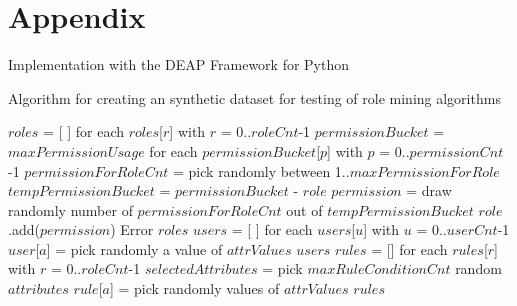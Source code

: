 \newpage
\section{Appendix}

Implementation with the DEAP Framework for Python \cite{DeRainville:2012}

\begin{algorithm}
\caption{Algorithm for creating an synthetic dataset for testing of role mining algorithms}
\label{alg:CreateDataSet}
\begin{algorithmic}[1]
    \State $roles$ = [ ] for each $roles$[$r$] with $r$ = 0..$roleCnt$-1
    \State $permissionBucket$ = $maxPermissionUsage$ for each $permissionBucket$[$p$] with $p$ = 0..$permissionCnt$-1
        \State $permissionForRoleCnt$ = pick randomly between 1..$maxPermissionForRole$
        \State $tempPermissionBucket$ = $permissionBucket$ - $role$
            \State $permission$ = draw randomly number of $permissionForRoleCnt$ out of $tempPermissionBucket$
            \State $role$.add($permission$)
        \Else
            \State Error
        \EndIf
    \EndFor
    \State \Return $roles$
\EndProcedure
\State
{}
    \State $users$ = [ ] for each $users$[$u$] with $u$ = 0..$userCnt$-1
            \State $user$[$a$] = pick randomly a value of $attrValues$
        \EndFor
    \EndFor
    \State \Return $users$
\EndProcedure
\State
{}
    \State $rules$ = [{}] for each $rules$[$r$] with $r$ = 0..$roleCnt$-1
        \State $selectedAttributes$ = pick $maxRuleConditionCnt$ random $attributes$
            \State $rule$[$a$] = pick randomly values of $attrValues$
        \EndFor
    \EndFor
    \State \Return $rules$
\EndProcedure
\end{algorithmic}
\end{algorithm}
